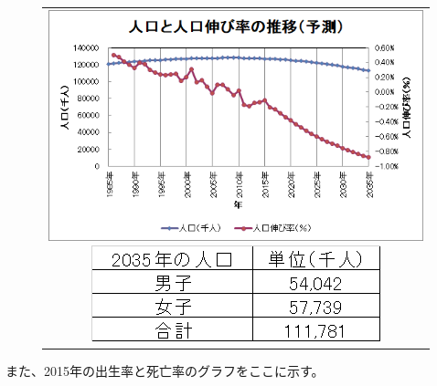 \documentclass[uplatex, titlepage]{jsarticle}
\begin{document}
\begin{figure}[H]
  \centering
    \begin{tabular}{c}
      \begin{minipage}{0.5\hsize}
        \begin{center}
          \includegraphics[scale=0.9]{./fffff/f1.png}
          \caption{}
          \label{fig:graphicx1}
        \end{center}
      \end{minipage}
      \begin{minipage}{0.5\hsize}
        \begin{center}
          \includegraphics[scale = 0.9]{./fffff/f2.png}
          \caption{}
          \label{fig:table1}
        \end{center}
      \end{minipage}
    \end{tabular}
\end{figure}

また、2015年の出生率と死亡率のグラフをここに示す。
\end{document}
